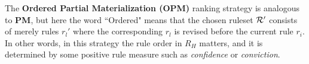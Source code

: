 The \textbf{Ordered Partial Materialization (OPM)} ranking strategy is analogous to \textbf{PM}, but here the word ``Ordered" means that the chosen ruleset $\mathcal{R}'$ consists of merely rules $r_l'$ where the corresponding $r_l$ is revised before the current rule $r_i$. In other words, in this strategy the rule order in $R_H$ matters, and it is determined by some positive rule measure such as \textit{confidence} or \textit{conviction}.